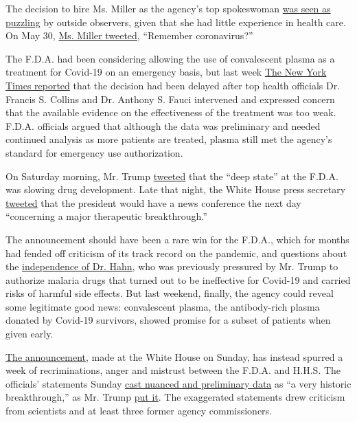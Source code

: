 The decision to hire Ms. Miller as the agency's top spokeswoman
\href{https://www.mediamatters.org/emily-miller/new-fda-spokesperson-emily-miller-pro-trump-sycophant-who-spreads-covid-19}{was
seen as puzzling} by outside observers, given that she had little
experience in health care. On May 30,
\href{https://twitter.com/emilymiller/status/1266938752288657410}{Ms.
Miller tweeted}, ``Remember coronavirus?''

The F.D.A. had been considering allowing the use of convalescent plasma
as a treatment for Covid-19 on an emergency basis, but last week
\href{https://www.nytimes3xbfgragh.onion/2020/08/19/us/politics/blood-plasma-covid-19.html}{The
New York Times reported} that the decision had been delayed after top
health officials Dr. Francis S. Collins and Dr. Anthony S. Fauci
intervened and expressed concern that the available evidence on the
effectiveness of the treatment was too weak. F.D.A. officials argued
that although the data was preliminary and needed continued analysis as
more patients are treated, plasma still met the agency's standard for
emergency use authorization.

On Saturday morning, Mr. Trump
\href{https://twitter.com/realDonaldTrump/status/1297138862108663808}{tweeted}
that the ``deep state'' at the F.D.A. was slowing drug development. Late
that night, the White House press secretary
\href{https://twitter.com/PressSec/status/1297373454262571008}{tweeted}
that the president would have a news conference the next day
``concerning a major therapeutic breakthrough.''

The announcement should have been a rare win for the F.D.A., which for
months had fended off criticism of its track record on the pandemic, and
questions about the
\href{https://www.nytimes3xbfgragh.onion/2020/08/10/health/stephen-hahn-fda.html}{independence
of Dr. Hahn}, who was previously pressured by Mr. Trump to authorize
malaria drugs that turned out to be ineffective for Covid-19 and carried
risks of harmful side effects. But last weekend, finally, the agency
could reveal some legitimate good news: convalescent plasma, the
antibody-rich plasma donated by Covid-19 survivors, showed promise for a
subset of patients when given early.

\href{https://www.nytimes3xbfgragh.onion/2020/08/23/us/politics/fda-plasma-coronavirus.html}{The
announcement}, made at the White House on Sunday, has instead spurred a
week of recriminations, anger and mistrust between the F.D.A. and H.H.S.
The officials' statements Sunday
\href{https://www.nytimes3xbfgragh.onion/2020/08/24/health/fda-blood-plasma.html}{cast
nuanced and preliminary data} as ``a very historic breakthrough,'' as
Mr. Trump
\href{https://www.whitehouse.gov/briefings-statements/remarks-president-trump-press-briefing-august-23-2020/}{put
it}. The exaggerated statements drew criticism from scientists and at
least three former agency commissioners.

